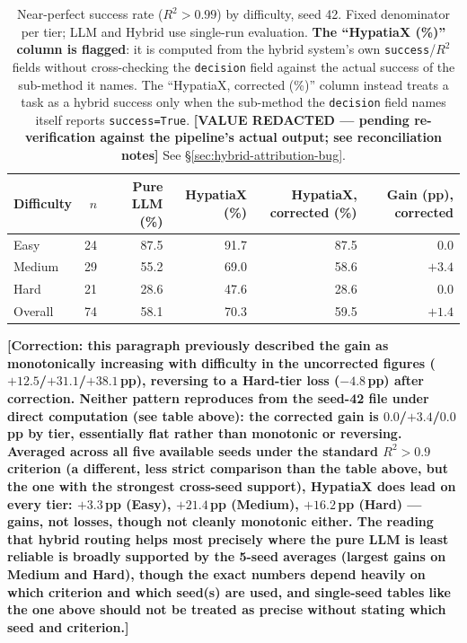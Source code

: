 \documentclass[twoside,11pt]{article}
\newcommand{\Rsq}{R^{2}}
\begin{document}
\begin{table}[h]
\centering
\caption{Near-perfect success rate ($\Rsq > 0.99$) by difficulty, seed 42.
Fixed denominator per tier; LLM and Hybrid use single-run evaluation.
\textbf{The ``HypatiaX (\%)'' column is flagged}: it is computed from the
hybrid system's own \texttt{success}/$\Rsq$ fields without cross-checking the
\texttt{decision} field against the actual success of the sub-method it
names. The ``HypatiaX, corrected (\%)'' column instead treats a task as a
hybrid success only when the sub-method the \texttt{decision} field names
itself reports \texttt{success=True}.
\textbf{[VALUE REDACTED --- pending re-verification against the pipeline's actual output; see reconciliation notes]} See \S\ref{sec:hybrid-attribution-bug}.}
\label{tab:difficulty}
\begin{tabular}{lrrrrr}
\toprule
Difficulty & $n$ & Pure LLM (\%) & HypatiaX (\%) & HypatiaX, corrected (\%) & Gain (pp), corrected \\
\midrule
Easy       & 24  & 87.5          & 91.7 & 87.5 & $0.0$ \\
Medium     & 29  & 55.2          & 69.0  & 58.6 & $+3.4$ \\
Hard       & 21  & 28.6          & 47.6  & 28.6 & $0.0$ \\
\midrule
Overall    & 74  & 58.1          & 70.3  & 59.5 & $+1.4$ \\
\bottomrule
\end{tabular}
\end{table}

\textbf{[Correction: this paragraph previously described the gain as
monotonically increasing with difficulty in the uncorrected figures
($+12.5$/$+31.1$/$+38.1$\,pp), reversing to a Hard-tier loss
($-4.8$\,pp) after correction. Neither pattern reproduces from the
seed-42 file under direct computation (see table above): the corrected
gain is $0.0$/$+3.4$/$0.0$\,pp by tier, essentially flat rather than
monotonic or reversing. Averaged across all five available seeds under
the standard $\Rsq>0.9$ criterion (a different, less strict comparison
than the table above, but the one with the strongest cross-seed
support), HypatiaX does lead on every tier: $+3.3$\,pp (Easy),
$+21.4$\,pp (Medium), $+16.2$\,pp (Hard) --- gains, not losses, though
not cleanly monotonic either. The reading that hybrid routing helps
most precisely where the pure LLM is least reliable is broadly
supported by the 5-seed averages (largest gains on Medium and Hard),
though the exact numbers depend heavily on which criterion and which
seed(s) are used, and single-seed tables like the one above should not
be treated as precise without stating which seed and criterion.]}
\end{document}
